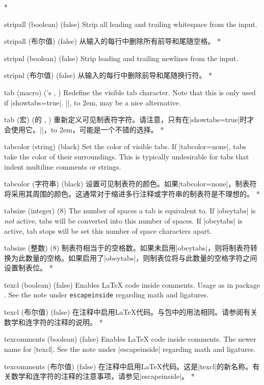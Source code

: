 \begin{optionlist}
\begin{paracol}{2}
\switchcolumn[0]*%

  \item[stripall (boolean) (false)]
    Strip all leading and trailing whitespace from the input.
    \switchcolumn
    \item[stripall (布尔值) (false)]
    从输入的每行中删除所有前导和尾随空格。
\switchcolumn[0]*%
  \item[stripnl (boolean) (false)]
    Strip leading and trailing newlines from the input.
    \switchcolumn
    \item[stripnl (布尔值) (false)]
    从输入的每行中删除前导和尾随换行符。
    \switchcolumn[0]*%
\item[tab (macro) ({\rmfamily\pkg{fancyvrb}'s} \string\FancyVerbTab, \FancyVerbTab)]
Redefine the visible tab character.  Note that this is only used if |showtabs=true|.  |\rightarrowfill|, \hbox to 2em{\rightarrowfill}, may be a nice alternative.
\switchcolumn
\item[tab (宏) ({\rmfamily\pkg{fancyvrb}的} \string\FancyVerbTab, \FancyVerbTab)]
重新定义可见制表符字符。请注意，只有在|showtabs=true|时才会使用它。|\rightarrowfill|，\hbox to 2em{\rightarrowfill}，可能是一个不错的选择。
\switchcolumn[0]*%
\item[tabcolor (string) (black)]
Set the color of visible tabs.  If |tabcolor=none|, tabs take the color of their surroundings.  This is typically undesirable for tabs that indent multiline comments or strings.
\switchcolumn
\item[tabcolor (字符串) (black)]
设置可见制表符的颜色。如果|tabcolor=none|，制表符将采用其周围的颜色。这通常对于缩进多行注释或字符串的制表符是不理想的。
\switchcolumn[0]*%

  \item[tabsize (integer) (8)]
    The number of spaces a tab is equivalent to.  If |obeytabs| is \emph{not} active, tabs will be converted into this number of spaces.  If |obeytabs| is active, tab stops will be set this number of space characters apart.
    \switchcolumn
    \item[tabsize (整数) (8)]
    制表符相当于的空格数。如果未启用|obeytabs|，则将制表符转换为此数量的空格。如果启用了|obeytabs|，则制表位将与此数量的空格字符之间设置制表位。
\switchcolumn[0]*%
  \item[texcl (boolean) (false)]
    Enables \LaTeX{} code inside comments.
    Usage as in package .  See the note under \texttt{escapeinside} regarding math and ligatures.
    \switchcolumn
    \item[texcl (布尔值) (false)]
    在注释中启用\LaTeX{}代码。与包中的用法相同。请参阅有关数学和连字符的注释的说明。
\switchcolumn[0]*%
  \item[texcomments (boolean) (false)]
    Enables \LaTeX{} code inside comments.  The newer name for |texcl|.  See the note under |escapeinside| regarding math and ligatures.
    \switchcolumn
    \item[texcomments (布尔值) (false)]
    在注释中启用\LaTeX{}代码。这是|texcl|的新名称。有关数学和连字符的注释的注意事项，请参见|escapeinside|。
\switchcolumn[0]*%


\end{paracol}
\end{optionlist}
